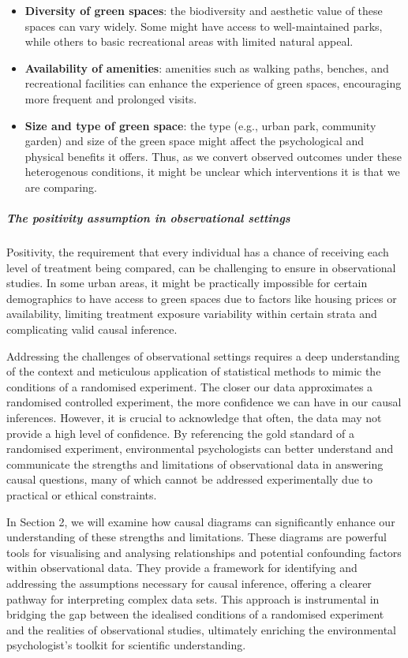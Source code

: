 \documentclass[
  singlecolumn]{article}
\let\oldsubparagraph\subparagraph
\renewcommand{\subparagraph}[1]{\oldsubparagraph{#1}\mbox{}}
\begin{document}
\begin{itemize}
\item
  \textbf{Diversity of green spaces}: the biodiversity and aesthetic
  value of these spaces can vary widely. Some might have access to
  well-maintained parks, while others to basic recreational areas with
  limited natural appeal.
\item
  \textbf{Availability of amenities}: amenities such as walking paths,
  benches, and recreational facilities can enhance the experience of
  green spaces, encouraging more frequent and prolonged visits.
\item
  \textbf{Size and type of green space}: the type (e.g., urban park,
  community garden) and size of the green space might affect the
  psychological and physical benefits it offers. Thus, as we convert
  observed outcomes under these heterogenous conditions, it might be
  unclear which interventions it is that we are comparing.
\end{itemize}

\subparagraph{The positivity assumption in observational
settings}\label{the-positivity-assumption-in-observational-settings}

Positivity, the requirement that every individual has a chance of
receiving each level of treatment being compared, can be challenging to
ensure in observational studies. In some urban areas, it might be
practically impossible for certain demographics to have access to green
spaces due to factors like housing prices or availability, limiting
treatment exposure variability within certain strata and complicating
valid causal inference.

Addressing the challenges of observational settings requires a deep
understanding of the context and meticulous application of statistical
methods to mimic the conditions of a randomised experiment. The closer
our data approximates a randomised controlled experiment, the more
confidence we can have in our causal inferences. However, it is crucial
to acknowledge that often, the data may not provide a high level of
confidence. By referencing the gold standard of a randomised experiment,
environmental psychologists can better understand and communicate the
strengths and limitations of observational data in answering causal
questions, many of which cannot be addressed experimentally due to
practical or ethical constraints.

In Section 2, we will examine how causal diagrams can significantly
enhance our understanding of these strengths and limitations. These
diagrams are powerful tools for visualising and analysing relationships
and potential confounding factors within observational data. They
provide a framework for identifying and addressing the assumptions
necessary for causal inference, offering a clearer pathway for
interpreting complex data sets. This approach is instrumental in
bridging the gap between the idealised conditions of a randomised
experiment and the realities of observational studies, ultimately
enriching the environmental psychologist's toolkit for scientific
understanding.
\end{document}
